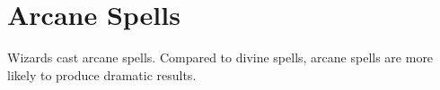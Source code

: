 \section{Arcane Spells}
Wizards cast arcane spells. Compared to divine spells, arcane spells are more likely to produce dramatic results.



